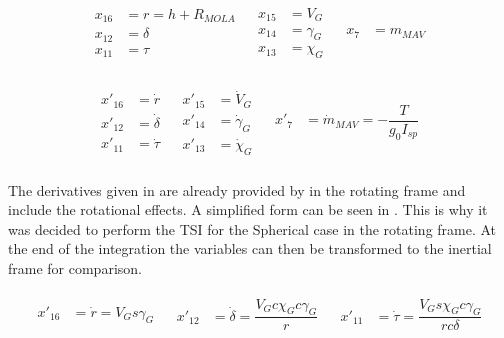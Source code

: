 \begin{align} \label{eq:spherVar}
\begin{split}
x_{16} &= r = h+R_{MOLA} \\
x_{12} &= \delta \\
x_{11} &= \tau \\
\end{split}
&
\begin{split}
x_{15} &= V_{G} \\
x_{14} &= \gamma_{G} \\
x_{13} &= \chi_{G} \\
\end{split}
&
\begin{split}
x_{7} &= m_{MAV} \\
\end{split}
\end{align}

\begin{align} \label{eq:spherVarD}
\begin{split}
x'_{16} &= \dot{r} \\
x'_{12} &= \dot{\delta} \\
x'_{11} &= \dot{\tau} \\
\end{split}
&
\begin{split}
x'_{15} &= \dot{V}_{G} \\
x'_{14} &= \dot{\gamma}_{G} \\
x'_{13} &= \dot{\chi}_{G} \\
\end{split}
&
\begin{split}
x'_{7} &= \dot{m}_{MAV} = -\dfrac{T}{g_{0}I_{sp}} \\
\end{split}
\end{align}

The derivatives given in  are already provided by \cite{mooij1994motion} in the rotating frame and include the rotational effects. A simplified form can be seen in . This is why it was decided to perform the \ac{TSI} for the Spherical case in the rotating frame. At the end of the integration the variables can then be transformed to the inertial frame for comparison.

\begin{align} \label{eq:kinEqSp}
\begin{split}
x'_{16} &= \dot{r} = V_{G} s \gamma_{G} \\
\end{split}
&
\begin{split}
x'_{12} &= \dot{\delta} = \dfrac{V_{G} c \chi_{G} c \gamma_{G}}{r} \\
\end{split}
&
\begin{split}
x'_{11} &= \dot{\tau} = \dfrac{V_{G} s \chi_{G} c \gamma_{G}}{r c \delta} \\
\end{split}
\end{align}


